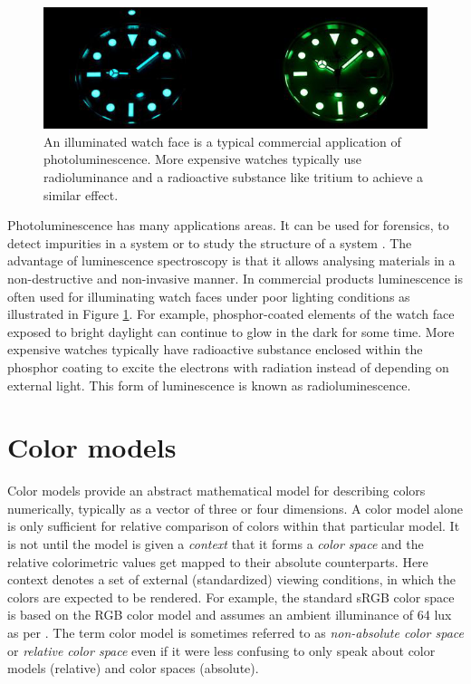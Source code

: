 \documentclass[thesis.tex]{subfiles}
\begin{document}
\begin{figure}[ht]
\centering \includegraphics[width=\textwidth]{images/photoluminescence_example}
\caption{An illuminated watch face is a typical commercial application of photoluminescence. More expensive watches typically use radioluminance and a radioactive substance like tritium to achieve a similar effect.\label{figure:photoluminescence_example}}
\end{figure}

Photoluminescence has many applications areas. It can be used for forensics, to detect impurities in a system or to study the structure of a system \cite{photoluminescence_use_case_2}\cite{photoluminescence_use_case_1}\cite{photoluminescence_use_case_3}. The advantage of luminescence spectroscopy is that it allows analysing materials in a non-destructive and non-invasive manner. In commercial products luminescence is often used for illuminating watch faces under poor lighting conditions as illustrated in Figure \ref{figure:photoluminescence_example}. For example, phosphor-coated elements of the watch face exposed to bright daylight can continue to glow in the dark for some time. More expensive watches typically have radioactive substance enclosed within the phosphor coating to excite the electrons with radiation instead of depending on external light. This form of luminescence is known as radioluminescence.

\section{Color models}
\label{section:rgbhsv}

Color models provide an abstract mathematical model for describing colors numerically, typically as a vector of three or four dimensions. A color model alone is only sufficient for relative comparison of colors within that particular model. It is not until the model is given a \textit{context} that it forms a \textit{color space} and the relative colorimetric values get mapped to their absolute counterparts. Here context denotes a set of external (standardized) viewing conditions, in which the colors are expected to be rendered. For example, the standard sRGB color space is based on the RGB color model and assumes an ambient illuminance of 64 lux as per \cite{iec}. The term color model is sometimes referred to as \textit{non-absolute color space} or \textit{relative color space} even if it were less confusing to only speak about color models (relative) and color spaces (absolute).
\end{document}
